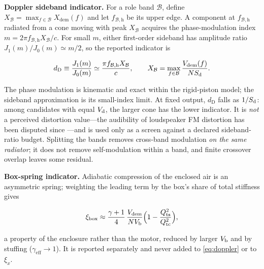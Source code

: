 \textbf{Doppler sideband indicator.} For a role band $\mathcal B$, define
$X_{\mathcal B}=\max_{f\in\mathcal B}X_{\mathrm{dem}}(f)$ and let
$f_{\mathcal B,\mathrm h}$ be its upper edge. A component at
$f_{\mathcal B,\mathrm h}$ radiated from a cone moving with peak
$X_{\mathcal B}$ acquires the phase-modulation index
$m=2\pi f_{\mathcal B,\mathrm h}X_{\mathcal B}/c$. For small $m$, either
first-order sideband has amplitude ratio $J_1(m)/J_0(m)\simeq m/2$, so the
reported indicator is

\begin{equation}
	d_{\mathrm D}\equiv\frac{J_1(m)}{J_0(m)}
	\simeq\frac{\pi f_{\mathcal B,\mathrm h}X_{\mathcal B}}{c},
	\qquad
	X_{\mathcal B}=\max_{f\in\mathcal B}
		\frac{V_{\mathrm{dem}}(f)}{NS_{\mathrm{d}}} .
	\label{eq:doppler}
\end{equation}

The phase modulation is kinematic and exact within the rigid-piston model;
the sideband approximation is its small-index limit. At fixed output,
$d_{\mathrm D}$ falls as $1/S_{\mathrm{d}}$: among candidates with equal $V_{\mathrm{d}}$, the
larger cone has the lower indicator. It is \emph{not} a perceived
distortion value---the audibility of loudspeaker FM distortion has been
disputed since \cite{klipsch1969,allison1982}---and is used only as a
screen against a declared sideband-ratio budget. Splitting the bands
removes cross-band modulation \emph{on the same radiator}; it does not
remove self-modulation within a band, and finite crossover overlap leaves
some residual.

\textbf{Box-spring indicator.} Adiabatic compression of the enclosed air is
an asymmetric spring; weighting the leading term by the box's share of
total stiffness gives

\begin{equation}
	\xi_{\mathrm{box}} \approx
		\frac{\gamma+1}{4}\,
		\frac{V_{\mathrm{dem}}}{NV_{\mathrm{b}}}\Big(1-\frac{Q_{\mathrm{ts}}^2}{Q_{\mathrm{tc}}^2}\Big),
	\label{eq:boxHD}
\end{equation}

a property of the enclosure rather than the motor, reduced by larger
$V_{\mathrm{b}}$ and by stuffing ($\gamma_{\mathrm{eff}}\to1$). It is reported
separately and never added to \cref{eq:doppler} or to $\xi_x$.

